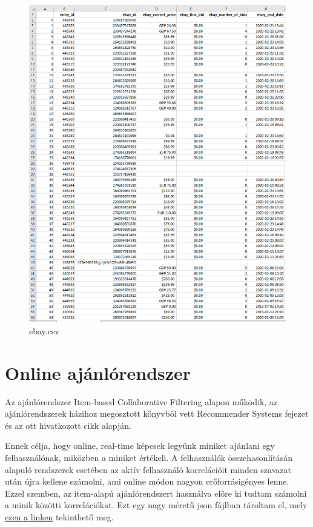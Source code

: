 \documentclass[14pt,a4paper]{article}
\begin{document}
\begin{figure}[H]
\centering
\includegraphics[width=1.0\columnwidth]{pics/csv_ebay.png}
\caption{ebay.csv}
\end{figure}

\section{Online ajánlórendszer}

Az ajánlórendszer Item-based Collaborative Filtering alapon működik, az ajánlórendszerek házihoz megosztott
\cite{sammut_encyclopedia_2010} könyvből vett Recommender Systems fejezet és az ott hivatkozott
\cite{linden_smith_york_2003} cikk alapján.

Ennek célja, hogy online, real-time képesek legyünk miniket ajánlani egy felhasználónak, miközben a miniket értékeli.
A felhasználók összehasonlításán alapuló rendszerek esetében az aktív felhasználó korrelációit minden szavazat után
újra kellene számolni, ami online módon nagyon erőforrásigényes lenne. Ezzel szemben, az item-alapú ajánlórendszert
használva előre ki tudtam számolni a minik közötti korrelációkat. Ezt egy nagy méretű json fájlban tároltam el,
mely
\href{https://raw.githubusercontent.com/nemkin/cool-mini-or-not/main/data/correlations.json}{ezen a linken}
tekinthető meg.
\end{document}
